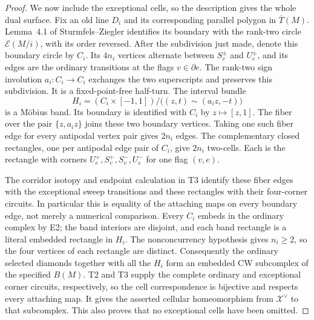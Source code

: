 \begin{proof}
We now include the exceptional cells, so the description gives the whole
dual surface. Fix an old line $D_i$ and its corresponding parallel
polygon in $\overline T(M)$. Lemma~4.1 of Sturmfels--Ziegler identifies
its boundary with the rank-two circle $\mathcal E(M/i)$, with its order
reversed. After the subdivision just made, denote this boundary circle
by $C_i$. Its $4n_i$ vertices alternate between $S_v^\pm$ and $U_e^\pm$,
and its edges are the ordinary transitions at the flags $v\in\partial e$.
The rank-two sign involution $a_i:C_i\to C_i$ exchanges the two superscripts
and preserves this subdivision. It is a fixed-point-free half-turn.
The interval bundle
\[
 H_i=(C_i\times[-1,1])/\bigl((z,t)\sim(a_i z,-t)\bigr)
\]
is a M\"obius band. Its boundary is identified with $C_i$ by
$z\mapsto[z,1]$. The fiber over the pair $\{z,a_i z\}$ joins these two
boundary vertices. Taking one such fiber edge for every antipodal
vertex pair gives $2n_i$ edges. The complementary closed rectangles,
one per antipodal edge pair of $C_i$, give $2n_i$ two-cells. Each is
the rectangle with corners
$U_e^+,S_v^+,S_v^-,U_e^-$ for one flag $(v,e)$.

The corridor isotopy and endpoint calculation in T3 identify these
fiber edges with the exceptional sweep transitions and these rectangles
with their four-corner circuits. In particular this is equality of
the attaching maps on every boundary edge, not merely a numerical
comparison. Every $C_i$ embeds in the ordinary complex by E2; the band
interiors are disjoint, and each band rectangle is a literal embedded
rectangle in $H_i$. The nonconcurrency hypothesis gives $n_i\geq2$, so
the four vertices of each rectangle are distinct. Consequently the
ordinary selected diamonds together with all the $H_i$ form an embedded
CW subcomplex of the specified $B(M)$. T2 and T3 supply the complete
ordinary and exceptional corner circuits, respectively, so the cell
correspondence is bijective and respects every attaching map. It gives
the asserted cellular homeomorphism from $\mathcal X^\vee$ to that
subcomplex. This also proves that no exceptional cells have been omitted.


\end{proof}
